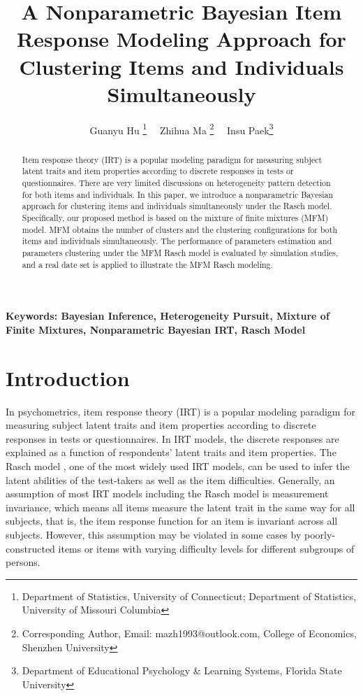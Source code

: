 \documentclass[12pt]{article}
\title{A Nonparametric Bayesian Item Response Modeling Approach for Clustering Items and Individuals Simultaneously}
\author
{Guanyu Hu \thanks{Department of Statistics, University of Connecticut; Department of Statistics, University of Missouri Columbia}~~ Zhihua Ma \thanks{Corresponding Author, Email: mazh1993@outlook.com, College of Economics, Shenzhen University}~~ Insu Paek\thanks{Department of Educational Psychology \& Learning Systems, Florida State University}}
\date{}
\begin{document}
\maketitle
\vspace*{-1cm}
\begin{abstract}
Item response theory (IRT) is a popular modeling paradigm for measuring subject latent traits and item properties according to discrete responses in tests or questionnaires. There are very limited discussions on heterogeneity pattern detection for both items and individuals. In this paper, we introduce a nonparametric Bayesian approach for clustering items and individuals simultaneously under the Rasch model. Specifically, our proposed method is based on the mixture of finite mixtures (MFM) model. MFM obtains the number of clusters and the clustering configurations for both items and individuals simultaneously. The performance of parameters estimation and parameters clustering under the MFM Rasch model is evaluated by simulation studies, and a real date set is applied to illustrate the MFM Rasch modeling.
\end{abstract}
\noindent 
\textbf{Keywords: Bayesian Inference, Heterogeneity Pursuit, Mixture of Finite Mixtures, Nonparametric Bayesian IRT, Rasch Model}

\section{Introduction}\label{sec:intro}

In psychometrics, item response theory (IRT) is a popular modeling paradigm for measuring subject latent traits and item properties according to discrete responses in tests or questionnaires. In IRT models, the discrete responses are explained as a function of respondents' latent traits and item properties. The Rasch model \citep[][]{rasch1960}, one of the most widely used IRT models, can be used to infer the latent abilities of the test-takers as well as the item difficulties. Generally, an assumption of most IRT models including the Rasch model is measurement invariance, which means all items measure the latent trait in the same way for all subjects, that is, the item response function for an item is invariant across all subjects. However, this assumption may be violated in some cases by poorly-constructed items or items with varying difficulty levels for different subgroups of persons. 
\end{document}
